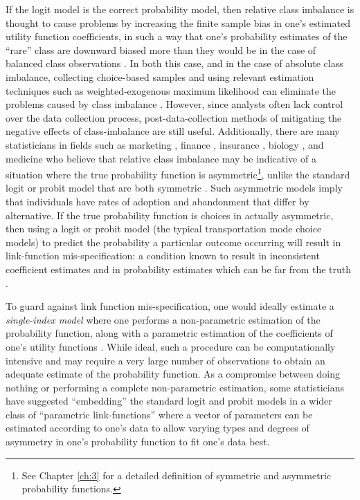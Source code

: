 If the logit model is the correct probability model, then relative class imbalance is thought to cause problems by increasing the finite sample bias in one's estimated utility function coefficients, in such a way that one's probability estimates of the ``rare'' class are downward biased more than they would be in the case of balanced class observations \citep{king_logistic_2001}. In both this case, and in the case of absolute class imbalance, collecting choice-based samples and using relevant estimation techniques such as weighted-exogenous maximum likelihood can eliminate the problems caused by class imbalance \citep{manski_estimation_1977, breslow_statistical_1987, king_logistic_2001}. However, since analysts often lack control over the data collection process, post-data-collection methods of mitigating the negative effects of class-imbalance are still useful. Additionally, there are many statisticians in fields such as marketing \citep{wang_generalized_2010}, finance \citep{calabrese_generalized_2011}, insurance \citep{bermudez_bayesian_2008, perez-sanchez_bayesian_2014}, biology \citep{jiang_new_2013}, and medicine \citep{saez-castillo_bayesian_2010} who believe that relative class imbalance may be indicative of a situation where the true probability function is asymmetric\footnote{See Chapter \ref{ch:3} for a detailed definition of symmetric and asymmetric probability functions.}, unlike the standard logit or probit model that are both symmetric \citep{chen_new_1999}. Such asymmetric models imply that individuals have rates of adoption and abandonment that differ by alternative. If the true probability function is choices in actually asymmetric, then using a logit or probit model (the typical transportation mode choice models) to predict the probability a particular outcome occurring will result in link-function mis-specification: a condition known to result in inconsistent coefficient estimates \citep{czado_effect_1992} and in probability estimates which can be far from the truth \citep{koenker_parametric_2009}. 

To guard against link function mis-specification, one would ideally estimate a \textit{single-index model} where one performs a non-parametric estimation of the probability function, along with a parametric estimation of the coefficients of one's utility functions \citep{hardle_semiparametric_1997, horowitz_semiparametric_2010}. While ideal, such a procedure can be computationally intensive and may require a very large number of observations to obtain an adequate estimate of the probability function. As a compromise between doing nothing or performing a complete non-parametric estimation, some statisticians \citep{czado_parametric_1994, koenker_parametric_2009} have suggested ``embedding'' the standard logit and probit models in a wider class of ``parametric link-functions'' where a vector of parameters can be estimated according to one's data to allow varying types and degrees of asymmetry in one's probability function to fit one's data best.

